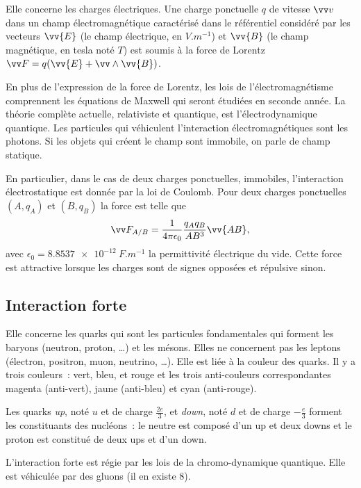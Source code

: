 Elle concerne les charges électriques. Une charge ponctuelle $q$ de vitesse
$\vvv$ dans un champ électromagnétique caractérisé dans le référentiel
considéré par les vecteurs $\vv{E}$ (le champ électrique, en $\si{V.m^{-1}}$)
et $\vv{B}$ (le champ magnétique, en tesla noté $\si{T}$) est soumis à la
force de Lorentz $\vF = q(\vv{E}+\vv \wedge \vv{B})$.

En plus de l'expression de la force de Lorentz, les lois de
l'électromagnétisme comprennent les équations de Maxwell qui seront étudiées
en seconde année. La théorie complète actuelle, relativiste et quantique, est
l'électrodynamique quantique. Les particules qui véhiculent l'interaction
électromagnétiques sont les photons. Si les objets qui créent le champ sont
immobile, on parle de champ statique.

En particulier, dans le cas de deux charges ponctuelles, immobiles,
l'interaction électrostatique est donnée par la loi de Coulomb. Pour deux
charges ponctuelles $(A, q_A)$ et $(B, q_B)$ la force est telle que
\begin{equation} \vF_{A/B} = \frac{1}{4\pi \epsilon_0} \frac{q_A q_B}{AB^3}
\vv{AB}, \end{equation} avec $\epsilon_0 = \SI{8,8537e-12}{F.m^{-1}}$ la
permittivité électrique du vide. Cette force est attractive lorsque les
charges sont de signes opposées et répulsive sinon.

\subsection{Interaction forte}
\label{chap2-subsec:interactionforte}

Elle concerne les quarks qui sont les particules fondamentales qui forment
les baryons (neutron, proton, \ldots) et les mésons. Elles ne concernent pas
les leptons (électron, positron, muon, neutrino, \ldots). Elle est liée à la
couleur des quarks. Il y a trois couleurs~: vert, bleu, et rouge et les trois
anti-couleurs correspondantes magenta (anti-vert), jaune (anti-bleu) et cyan
(anti-rouge).

Les quarks \emph{up}, noté $u$ et de charge $\frac{2e}{3}$, et \emph{down},
noté $d$ et de charge $-\frac{e}{3}$ forment les constituants des nucléons~:
le neutre est composé d'un up et deux downs et le proton est constitué de
deux ups et d'un down.

L'interaction forte est régie par les lois de la chromo-dynamique quantique.
Elle est véhiculée par des gluons (il en existe 8).

